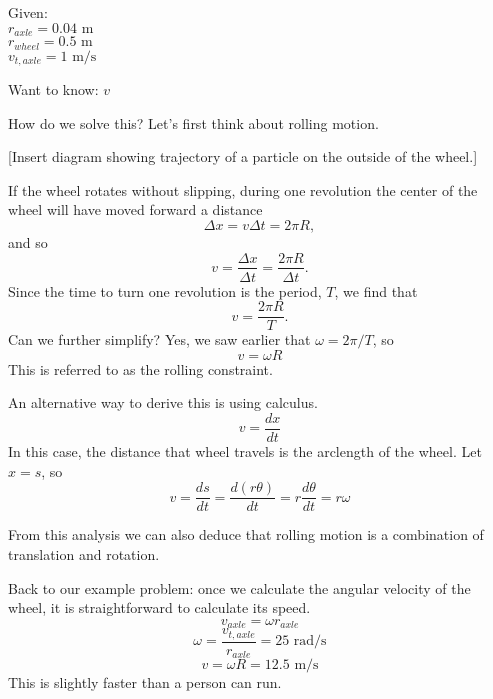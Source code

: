 Given:\\
$r_{axle}=0.04\mbox{ m}$\\
$r_{wheel}=0.5\mbox{ m}$\\
$v_{t,axle}=1\mbox{ m/s}$

Want to know: $v$

How do we solve this? Let's first think about rolling motion.

[Insert diagram showing trajectory of a particle on the outside of the wheel.]
\vspace{5cm}

If the wheel rotates without slipping, during one revolution the center of the wheel will have moved forward a distance
$$\Delta x=v\Delta t=2\pi R,$$
and so
$$v=\frac{\Delta x}{\Delta t}=\frac{2\pi R}{\Delta t}.$$
Since the time to turn one revolution is the period, $T$, we find that
$$v=\frac{2\pi R}{T}.$$
Can we further simplify? Yes, we saw earlier that $\omega=2\pi/T$, so
$$\boxed{v=\omega R}$$
This is referred to as the rolling constraint.

An alternative way to derive this is using calculus.
$$v=\frac{dx}{dt}$$
In this case, the distance that wheel travels is the arclength of the wheel. Let $x=s$, so
$$v=\frac{ds}{dt}=\frac{d(r\theta)}{dt}=r\frac{d\theta}{dt}=r\omega$$

From this analysis we can also deduce that rolling motion is a combination of translation and rotation.

\clearpage
[Insert diagram of translation + rotation = rolling.]
\vspace{5cm}

Back to our example problem: once we calculate the angular velocity of the wheel, it is straightforward to calculate its speed.
$$v_{axle}=\omega r_{axle}$$
$$\omega=\frac{v_{t,axle}}{r_{axle}}=25\mbox{ rad/s}$$
$$v=\omega R=12.5\mbox{ m/s}$$
This is slightly faster than a person can run.

\clearpage
